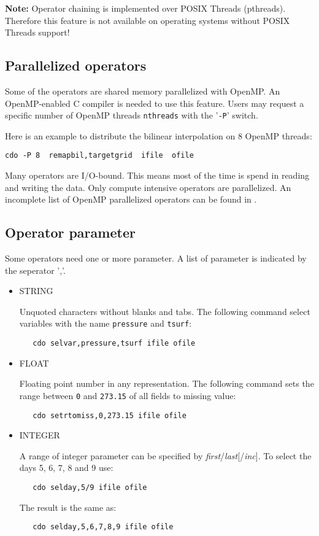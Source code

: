 {\bf Note:}
Operator chaining is implemented over POSIX Threads (pthreads).
Therefore this {\CDO} feature is not available on operating systems without POSIX Threads support!


\subsection{Parallelized operators}

Some of the {\CDO} operators are shared memory parallelized with OpenMP.
An OpenMP-enabled C compiler is needed to use this feature.
Users may request a specific number of OpenMP threads {\tt nthreads} with the '{\tt -P}' switch.

Here is an example to distribute the bilinear interpolation on 8 OpenMP threads:
\begin{lstlisting}[frame=single, backgroundcolor=\color{pcolor2}, basicstyle=\ttfamily, columns=flexible]
   cdo -P 8  remapbil,targetgrid  ifile  ofile
\end{lstlisting}

Many {\CDO} operators are I/O-bound. This means most of the time is spend in reading and writing the data. 
Only compute intensive {\CDO} operators are parallelized. 
An incomplete list of OpenMP parallelized operators can be found in .

\subsection{Operator parameter}

Some operators need one or more parameter. A list of parameter is indicated by the seperator ','.

\begin{itemize}
\item STRING

Unquoted characters without blanks and tabs.
The following command select variables with the name {\tt pressure} and {\tt tsurf}:
\begin{verbatim}
   cdo selvar,pressure,tsurf ifile ofile
\end{verbatim}

\item FLOAT

Floating point number in any representation.
The following command sets the range between {\tt 0} and {\tt 273.15}
of all fields to missing value:
\begin{verbatim}
   cdo setrtomiss,0,273.15 ifile ofile
\end{verbatim}

\item INTEGER

A range of integer parameter can be specified by {\it first}/{\it last}[/{\it inc}].
To select the days 5, 6, 7, 8 and 9 use:
\begin{verbatim}
   cdo selday,5/9 ifile ofile
\end{verbatim}
The result is the same as:
\begin{verbatim}
   cdo selday,5,6,7,8,9 ifile ofile
\end{verbatim}
\end{itemize}
